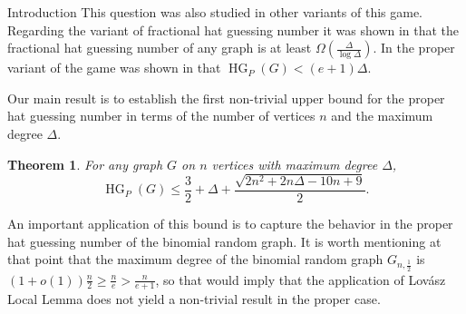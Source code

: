 \documentclass[11pt, letterpaper]{article}
\theoremstyle{plain}
\theoremstyle{plain}
\newtheorem{theorem}{Theorem}[section]
\begin{document}
\begin{section}{Introduction}
This question was also studied in other variants of this game. Regarding the variant of fractional hat guessing number it was shown in \cite{blavzej2023bears} that the fractional hat guessing number of any graph is at least $\Omega\left(\frac{\Delta}{\log\Delta}\right)$. In the proper variant of the game was shown in  \cite{adriaensen2026hatguessingpropercolorings} that $\operatorname{HG}_{P}(G) < (e+1)\Delta$.

\vspace{1em}

Our main result is to establish the first non-trivial upper bound for the proper hat guessing number in terms of the number of vertices \(n\) and the maximum degree $\Delta$.


\begin{theorem}\label{thm:main_bound}
For any graph $G$ on $n$ vertices with maximum degree $\Delta$, 
$$\operatorname{HG}_{P}(G) \leq \frac{3}{2}+ \Delta+ \frac{\sqrt{2n^{2}+2n\Delta-10n+9}}{2}. $$
\end{theorem}

An important application of this bound is to capture the behavior in the proper hat guessing number of the binomial random graph. It is worth mentioning at that point that the maximum degree of the binomial random graph $G_{n,\frac{1}{2}}$ is $(1+o(1))\frac{n}{2} \geq \frac{n}{e} > \frac{n}{e+1}$, so that would imply that the application of Lov\'{a}sz Local Lemma does not yield a non-trivial result in the proper case.


\end{section}
\end{document}
